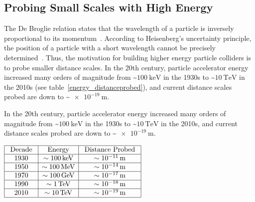 \subsection{Probing Small Scales with High Energy}
The De Broglie relation states that the wavelength of a particle is inversely proportional to its momentum~\cite{de1924recherches}.
According to Heisenberg's uncertainty principle, the position of a particle with a short wavelength cannot be precisely determined~\cite{Heisenberg1927}.
Thus, the motivation for building higher energy particle colliders is to probe smaller distance scales.
In the 20th century, particle accelerator energy increased many orders of magnitude from \sim$\SI{100}{\keV}$ in the 1930s to \sim$\SI{10}{\TeV}$ in the 2010s (see table~\ref{energy_distanceprobed}), and current distance scales probed are down to \sim$\SI{e-19}{\m}$.
\begin{table}[htb]
\caption{In the 20th century, particle accelerator energy increased many orders of magnitude from \sim$\SI{100}{\keV}$ in the 1930s to \sim$\SI{10}{\TeV}$ in the 2010s, and current distance scales probed are down to \sim$\SI{e-19}{\m}$.
        }
\vspace*{6pt}
\begin{center}
\begin{math}
\begin{array}{|c|c|c|}
\hline \text { Decade } & \text { Energy } & \text { Distance Probed } \\
\hline 1930 & \sim \SI{100}{\keV} & \sim \SI{e-11}{\m} \\
\hline 1950 & \sim \SI{100}{\MeV} & \sim \SI{e-14}{\m} \\
\hline 1970 & \sim \SI{100}{\GeV} & \sim \SI{e-17}{\m} \\
\hline 1990 & \sim \SI{1}{\TeV} & \sim \SI{e-18}{\m} \\
\hline 2010 & \sim \SI{10}{\TeV} & \sim \SI{e-19}{\m} \\
\hline
\end{array}
\end{math}
\label{energy_distanceprobed}
\end{center}
\end{table}

